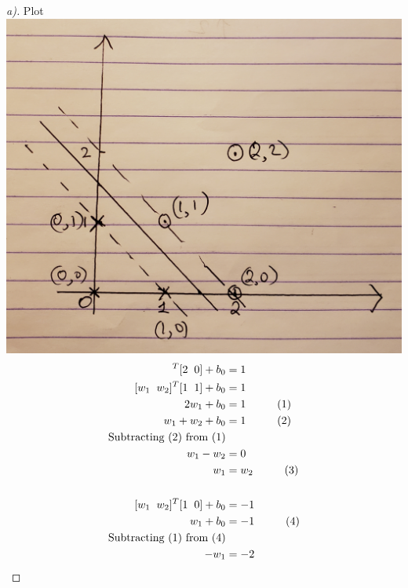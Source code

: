 \documentclass[12pt]{article}
\newenvironment{theorem}[2][Theorem]{\begin{trivlist}
\item[\hskip \labelsep {\bfseries #1}\hskip \labelsep {\bfseries #2.}]}{\end{trivlist}}
\begin{document}
\begin{theorem}[Ans]{4}
\begin{proof}[a)]Plot\\
\includegraphics[scale=0.15]{q4}
\pagebreak
\begin{align*}
[w_{1} \hspace{2mm} w_{2}]^{T}[2 \hspace{2mm} 0] + b_{0} &= 1 \\
[w_{1} \hspace{2mm} w_{2}]^{T}[1 \hspace{2mm} 1] + b_{0} &= 1 \\
2w_{1} + b_{0} &= 1 \hspace{10mm} (1)\\
w_{1} + w_{2} + b_{0} &= 1 \hspace{10mm} (2)\\
\text{Subtracting (2) from (1)}\\
w_{1} - w_{2} &= 0\\
w_{1} &= w_{2}  \hspace{10mm} (3)\\
\\
[w_{1} \hspace{2mm} w_{2}]^{T}[1 \hspace{2mm} 0] + b_{0} &= -1 \\
w_{1}+b_{0}&=-1 \hspace{10mm} (4)\\
\text{Subtracting (1) from (4)}\\
-w_{1} &= -2\\

\end{align*}
\end{proof}
\end{theorem}
\end{document}
